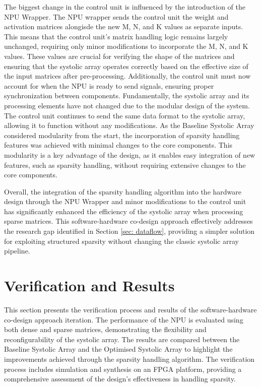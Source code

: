 \documentclass[12pt, a4paper, ukenglish]{article}
\begin{document}
    The biggest change in the control unit is influenced by the introduction of the NPU Wrapper. The NPU wrapper sends the control unit the weight and activation matrices alongisde the new M, N, and K values as separate inputs. This means that the control unit's matrix handling logic remains largely unchanged, requiring only minor modifications to incorporate the M, N, and K values. These values are crucial for verifying the shape of the matrices and ensuring that the systolic array operates correctly based on the effective size of the input matrices after pre-processing. Additionally, the control unit must now account for when the NPU is ready to send signals, ensuring proper synchronization between components.
    Fundamentally, the systolic array and its processing elements have not changed due to the modular design of the system. The control unit continues to send the same data format to the systolic array, allowing it to function without any modifications. As the Baseline Systolic Array considered modularity from the start, the incorporation of sparsity handling features was achieved with minimal changes to the core components. This modularity is a key advantage of the design, as it enables easy integration of new features, such as sparsity handling, without requiring extensive changes to the core components.

    Overall, the integration of the sparsity handling algorithm into the hardware design through the NPU Wrapper and minor modifications to the control unit has significantly enhanced the efficiency of the systolic array when processing sparse matrices. This software-hardware co-design approach effectively addresses the research gap identified in Section \ref{sec: dataflow}, providing a simpler solution for exploiting structured sparsity without changing the classic systolic array pipeline.



    


    

    
\section{Verification and Results} \label{sec: verification}
    This section presents the verification process and results of the software-hardware co-design approach iteration. The performance of the NPU is evaluated using both dense and sparse matrices, demonstrating the flexibility and reconfigurability of the systolic array. The results are compared between the Baseline Systolic Array and the Optimised Systolic Array to highlight the improvements achieved through the sparsity handling algorithm. The verification process includes simulation and synthesis on an FPGA platform, providing a comprehensive assessment of the design's effectiveness in handling sparsity.
\end{document}
